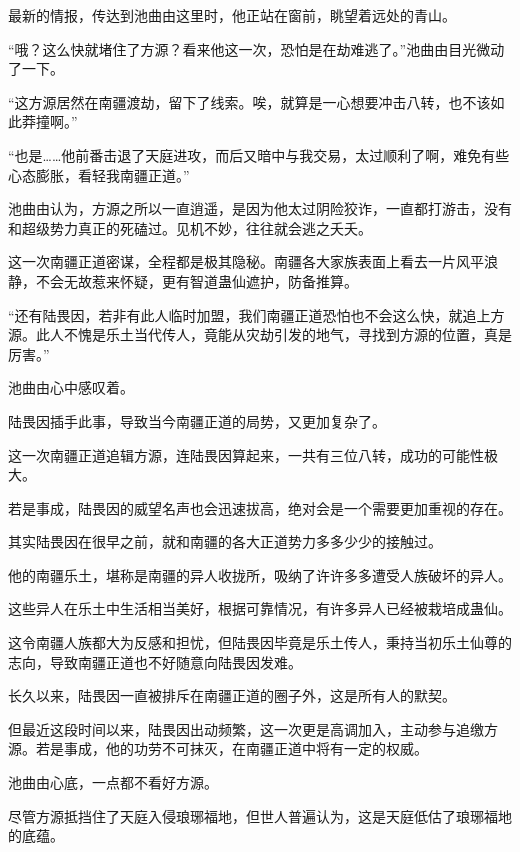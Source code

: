 
\begin{this_body}

最新的情报，传达到池曲由这里时，他正站在窗前，眺望着远处的青山。

“哦？这么快就堵住了方源？看来他这一次，恐怕是在劫难逃了。”池曲由目光微动了一下。

“这方源居然在南疆渡劫，留下了线索。唉，就算是一心想要冲击八转，也不该如此莽撞啊。”

“也是……他前番击退了天庭进攻，而后又暗中与我交易，太过顺利了啊，难免有些心态膨胀，看轻我南疆正道。”

池曲由认为，方源之所以一直逍遥，是因为他太过阴险狡诈，一直都打游击，没有和超级势力真正的死磕过。见机不妙，往往就会逃之夭夭。

这一次南疆正道密谋，全程都是极其隐秘。南疆各大家族表面上看去一片风平浪静，不会无故惹来怀疑，更有智道蛊仙遮护，防备推算。

“还有陆畏因，若非有此人临时加盟，我们南疆正道恐怕也不会这么快，就追上方源。此人不愧是乐土当代传人，竟能从灾劫引发的地气，寻找到方源的位置，真是厉害。”

池曲由心中感叹着。

陆畏因插手此事，导致当今南疆正道的局势，又更加复杂了。

这一次南疆正道追辑方源，连陆畏因算起来，一共有三位八转，成功的可能性极大。

若是事成，陆畏因的威望名声也会迅速拔高，绝对会是一个需要更加重视的存在。

其实陆畏因在很早之前，就和南疆的各大正道势力多多少少的接触过。

他的南疆乐土，堪称是南疆的异人收拢所，吸纳了许许多多遭受人族破坏的异人。

这些异人在乐土中生活相当美好，根据可靠情况，有许多异人已经被栽培成蛊仙。

这令南疆人族都大为反感和担忧，但陆畏因毕竟是乐土传人，秉持当初乐土仙尊的志向，导致南疆正道也不好随意向陆畏因发难。

长久以来，陆畏因一直被排斥在南疆正道的圈子外，这是所有人的默契。

但最近这段时间以来，陆畏因出动频繁，这一次更是高调加入，主动参与追缴方源。若是事成，他的功劳不可抹灭，在南疆正道中将有一定的权威。

池曲由心底，一点都不看好方源。

尽管方源抵挡住了天庭入侵琅琊福地，但世人普遍认为，这是天庭低估了琅琊福地的底蕴。


\end{this_body}
